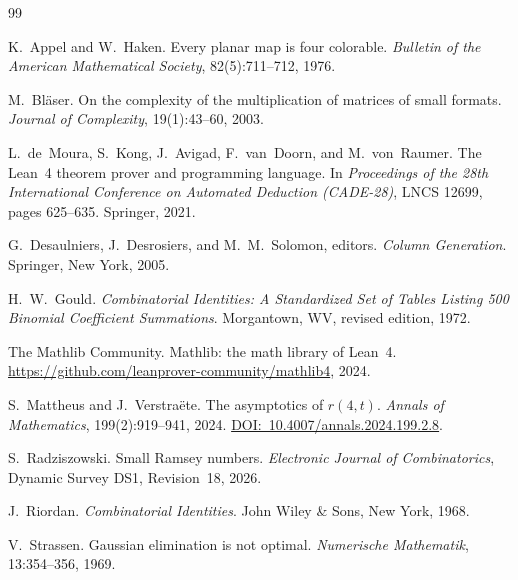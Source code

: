 \documentclass[11pt,a4paper]{article}
\begin{document}
\begin{thebibliography}{99}

K.~Appel and W.~Haken.
\newblock Every planar map is four colorable.
\newblock \emph{Bulletin of the American Mathematical Society},
  82(5):711--712, 1976.

M.~Bläser.
\newblock On the complexity of the multiplication of matrices of small formats.
\newblock \emph{Journal of Complexity}, 19(1):43--60, 2003.

L.~de~Moura, S.~Kong, J.~Avigad, F.~van~Doorn, and M.~von~Raumer.
\newblock The {Lean~4} theorem prover and programming language.
\newblock In \emph{Proceedings of the 28th International Conference on
  Automated Deduction (CADE-28)}, LNCS 12699, pages 625--635. Springer, 2021.

G.~Desaulniers, J.~Desrosiers, and M.~M.~Solomon, editors.
\newblock \emph{Column Generation}.
\newblock Springer, New York, 2005.

H.~W.~Gould.
\newblock \emph{Combinatorial Identities: A Standardized Set of Tables Listing
  500 Binomial Coefficient Summations}.
\newblock Morgantown, WV, revised edition, 1972.

{The Mathlib Community}.
\newblock Mathlib: the math library of {Lean~4}.
\newblock \url{https://github.com/leanprover-community/mathlib4}, 2024.

S.~Mattheus and J.~Verstraëte.
\newblock The asymptotics of $r(4,t)$.
\newblock \emph{Annals of Mathematics}, 199(2):919--941, 2024.
\newblock \href{https://doi.org/10.4007/annals.2024.199.2.8}%
  {DOI:~10.4007/annals.2024.199.2.8}.

S.~Radziszowski.
\newblock Small {R}amsey numbers.
\newblock \emph{Electronic Journal of Combinatorics}, Dynamic Survey DS1,
  Revision~18, 2026.

J.~Riordan.
\newblock \emph{Combinatorial Identities}.
\newblock John Wiley \& Sons, New York, 1968.

V.~Strassen.
\newblock Gaussian elimination is not optimal.
\newblock \emph{Numerische Mathematik}, 13:354--356, 1969.

\end{thebibliography}
\end{document}
